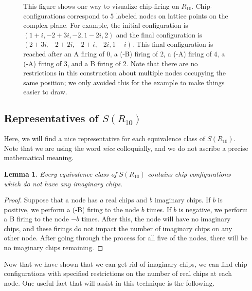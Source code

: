 \documentclass[12p]{amsart}
\numberwithin{equation}{section}
\theoremstyle{plain}
\newtheorem{lemma}[thm]{Lemma}
\theoremstyle{definition}
\begin{document}
\begin{figure}
\begin{center}
    \caption{This figure shows one way to visualize chip-firing on $R_{10}$. Chip-configurations correspond to 5 labeled nodes on lattice points on the complex plane. For example, the initial configuration is $(1+i, -2 + 3i, -2, 1-2i, 2)$ and the final configuration is $(2+3i, -2 + 2i, -2 + i,-2i, 1-i)$. This final configuration is reached after an A firing of 0, a (-B) firing of 2, a (-A) firing of 4, a (-A) firing of 3, and a B firing of 2. Note that there are no restrictions in this construction about multiple nodes occupying the same position; we only avoided this for the example to make things easier to draw.}
    \label{fig:geometric}
\end{center}
\end{figure}

\subsection{Representatives of $S(R_{10})$}
Here, we will find a nice representative for each equivalence class of $S(R_{10})$. Note that we are using the word \emph{nice} colloquially, and we do not ascribe a precise mathematical meaning. 

\begin{lemma}\label{lem:no_i}
    Every equivalence class of $S(R_{10})$ contains chip configurations which do not have any imaginary chips. 
\end{lemma}
\begin{proof}
    Suppose that a node has $a$ real chips and $b$ imaginary chips. If $b$ is positive, we perform a (-B) firing to the node $b$ times. If $b$ is negative, we perform a B firing to the node $-b$ times. After this, the node will have no imaginary chips, and these firings do not impact the number of imaginary chips on any other node. After going through the process for all five of the nodes, there will be no imaginary chips remaining. 
\end{proof}

Now that we have shown that we can get rid of imaginary chips, we can find chip configurations with specified restrictions on the number of real chips at each node. One useful fact that will assist in this technique is the following. 
\end{document}

